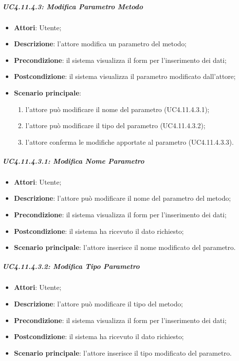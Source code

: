 \begin{itemize}
\begin{itemize}
\begin{itemize}
\begin{itemize}
\subparagraph{UC4.11.4.3: Modifica Parametro Metodo}
\label{UC4.11.4.3}
\begin{itemize}
	\item \textbf{Attori}: Utente;
	\item \textbf{Descrizione}: l'attore modifica un parametro del metodo;
	\item \textbf{Precondizione}: il sistema visualizza il form per l'inserimento dei dati;
	\item \textbf{Postcondizione}: il sistema visualizza il parametro modificato dall'attore;
	\item \textbf{Scenario principale}:
	\begin{enumerate}
		\item l'attore può modificare il nome del parametro (UC4.11.4.3.1);
		\item l'attore può modificare il tipo del parametro (UC4.11.4.3.2);
		\item l'attore conferma le modifiche apportate al parametro (UC4.11.4.3.3).
	\end{enumerate}
\end{itemize}

\subparagraph{UC4.11.4.3.1: Modifica Nome Parametro}
\label{UC4.11.4.3.1}
\begin{itemize}
	\item \textbf{Attori}: Utente;
	\item \textbf{Descrizione}: l'attore può modificare il nome del parametro del metodo;
	\item \textbf{Precondizione}: il sistema visualizza il form per l'inserimento dei dati;
	\item \textbf{Postcondizione}: il sistema ha ricevuto il dato richiesto;
	\item \textbf{Scenario principale}: l'attore inserisce il nome modificato del parametro.
\end{itemize}

\subparagraph{UC4.11.4.3.2: Modifica Tipo Parametro}
\label{UC4.11.4.3.2}
\begin{itemize}
	\item \textbf{Attori}: Utente;
	\item \textbf{Descrizione}: l'attore può modificare il tipo del metodo;
	\item \textbf{Precondizione}: il sistema visualizza il form per l'inserimento dei dati;
	\item \textbf{Postcondizione}: il sistema ha ricevuto il dato richiesto;
	\item \textbf{Scenario principale}: l'attore inserisce il tipo modificato del parametro.
\end{itemize}


\end{itemize}
\end{itemize}
\end{itemize}
\end{itemize}
